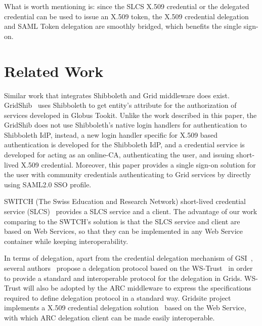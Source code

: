 \documentclass[twocolumn]{svjour3}         %
\begin{document}
What is worth mentioning is: since the SLCS X.509 credential or the delegated credential can be used to issue an X.509 token, the X.509 credential delegation and SAML Token delegation are smoothly bridged, which benefits the single sign-on.

\section{Related Work}
\label{sec:relatedwork}
Similar work that integrates Shibboleth and Grid middleware does exist. GridShib~\cite{VWelch05,TBarton06} uses Shibboleth to get entity's attribute for the authorization of services developed in Globus Tookit. Unlike the work described in this paper, the GridShib does not use Shibboleth's native login handlers for authentication to Shibboleth IdP, instead, a new login handler specific for X.509 based authentication is developed for the Shibboleth IdP, and a credential service is developed for acting as an online-CA, authenticating the user, and issuing short-lived X.509 credential. Moreover, this paper provides a single sign-on solution for the user with community credentials authenticating to Grid services by directly using SAML2.0 SSO profile.

SWITCH (The Swiss Education and Research Network) short-lived credential service (SLCS)~\cite{switchslcslink} provides a SLCS service and a client. The advantage of our work comparing to the SWTCH's solution is that the SLCS service and client are based on Web Services, so that they can be implemented in any Web Service container while keeping interoperability.

In terms of delegation, apart from the credential delegation mechanism of GSI~\cite{IFoster98,VWelch04}, several authors~\cite{MAhsant04} propose a delegation protocol based on the WS-Trust~\cite{WSTrustlink} in order to provide a standard and interoperable protocol for the delegation in Grids. WS-Trust will also be adopted by the ARC middleware to express the specifications required to define delegation protocol in a standard way. Gridsite project implements a X.509 credential delegation solution~\cite{GridSitelink} based on the Web Service, with which ARC delegation client can be made easily interoperable.
\end{document}
